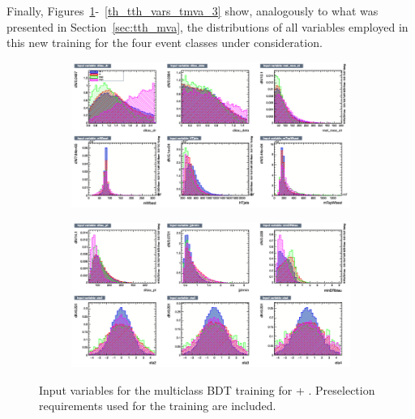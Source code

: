 Finally, Figures~\ref{th_tth_vars_tmva_1}-~\ref{th_tth_vars_tmva_3} show, analogously to what was presented in Section~\ref{sec:tth_mva}, the distributions of all variables employed in this new training for the four event classes under consideration.

\begin{figure}[htbp]
  \centering
  \begin{subfigure}{0.95\linewidth}
    \centering
    \includegraphics[width=\linewidth]{images/plots_tH_tHqb_for_thesis/variables_id_c1.png}
  \end{subfigure}
  \vspace{0.5cm} %
  \begin{subfigure}{0.95\linewidth}
    \centering
    \includegraphics[width=\linewidth]{images/plots_tH_tHqb_for_thesis/variables_id_c2.png}
  \end{subfigure}
  \caption{Input variables for the multiclass BDT training for \thtt + \ttHtt. Preselection requirements used for the training are included.}
  \label{th_tth_vars_tmva_1}
  \end{figure}

